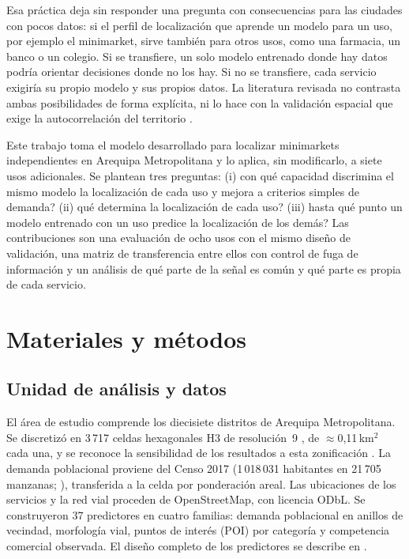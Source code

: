 \documentclass[10pt,letterpaper,twocolumn]{article}
\begin{document}
Esa práctica deja sin responder una pregunta con consecuencias para las ciudades con pocos datos: si el perfil de localización que aprende un modelo para un uso, por ejemplo el minimarket, sirve también para otros usos, como una farmacia, un banco o un colegio. Si se transfiere, un solo modelo entrenado donde hay datos podría orientar decisiones donde no los hay. Si no se transfiere, cada servicio exigiría su propio modelo y sus propios datos. La literatura revisada no contrasta ambas posibilidades de forma explícita, ni lo hace con la validación espacial que exige la autocorrelación del territorio \citep{ploton2020,roberts2017,meyer2021}.

Este trabajo toma el modelo desarrollado para localizar minimarkets independientes en Arequipa Metropolitana \citep{casapia2026} y lo aplica, sin modificarlo, a siete usos adicionales. Se plantean tres preguntas: (i) \textquestiondown{}con qué capacidad discrimina el mismo modelo la localización de cada uso y mejora a criterios simples de demanda? (ii) \textquestiondown{}qué determina la localización de cada uso? (iii) \textquestiondown{}hasta qué punto un modelo entrenado con un uso predice la localización de los demás? Las contribuciones son una evaluación de ocho usos con el mismo diseño de validación, una matriz de transferencia entre ellos con control de fuga de información y un análisis de qué parte de la señal es común y qué parte es propia de cada servicio.

\section{Materiales y métodos}

\subsection{Unidad de análisis y datos}

El área de estudio comprende los diecisiete distritos de Arequipa Metropolitana. Se discretizó en 3\,717 celdas hexagonales H3 de resolución~9 \citep{brodsky2018,kmoch2022}, de $\approx$0,11\,km$^2$ cada una, y se reconoce la sensibilidad de los resultados a esta zonificación \citep{openshaw1984}. La demanda poblacional proviene del Censo 2017 (1\,018\,031 habitantes en 21\,705 manzanas; \citealp{inei2018}), transferida a la celda por ponderación areal. Las ubicaciones de los servicios y la red vial proceden de OpenStreetMap, con licencia ODbL. Se construyeron 37 predictores en cuatro familias: demanda poblacional en anillos de vecindad, morfología vial, puntos de interés (POI) por categoría y competencia comercial observada. El diseño completo de los predictores se describe en \citet{casapia2026}.
\end{document}
